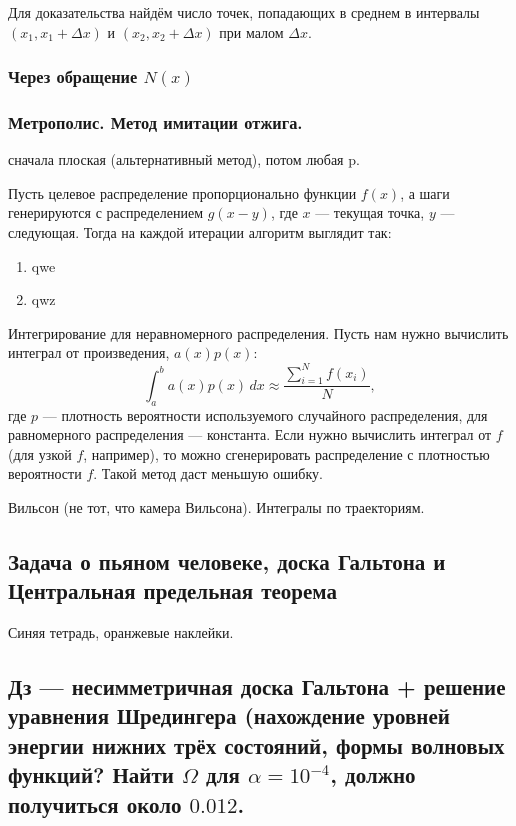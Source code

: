 \documentclass{book}
\begin{document}
Для доказательства найдём число точек, попадающих в среднем в интервалы $(x_1, x_1 + \Delta x)$ и
$(x_2, x_2 + \Delta x)$ при малом $\Delta x$.

\subsubsection{Через обращение $N(x)$}

\subsubsection{Метрополис. Метод имитации отжига.}

сначала плоская (альтернативный метод), потом любая p.

Пусть целевое распределение пропорционально функции $f(x)$, а шаги генерируются с распределением
$g(x - y)$, где $x$ --- текущая точка, $y$ --- следующая. Тогда на каждой итерации алгоритм
выглядит так:
\begin{enumerate}
    \item qwe
    \item qwz
\end{enumerate}

Интегрирование для неравномерного распределения. Пусть нам нужно вычислить интеграл от
произведения, $a(x) p(x)$:
\begin{equation}
    \int_a^b a(x) p(x) \, dx \approx \frac{\sum_{i=1}^N f(x_i)}{N},
\end{equation}
где $p$ --- плотность вероятности используемого случайного распределения, для равномерного
распределения --- константа. Если нужно вычислить интеграл от $f$ (для узкой $f$, например), то
можно сгенерировать распределение с плотностью вероятности $f$. Такой метод даст
меньшую ошибку.

Вильсон (не тот, что камера Вильсона). Интегралы по траекториям.

\subsection{Задача о пьяном человеке, доска Гальтона и Центральная предельная теорема}

Синяя тетрадь, оранжевые наклейки.

\subsection{Дз --- несимметричная доска Гальтона + решение уравнения Шредингера (нахождение уровней
энергии нижних трёх состояний, формы волновых функций? Найти $\Omega$ для $\alpha = 10^{-4}$,
должно получиться около $0.012$.}
\end{document}
